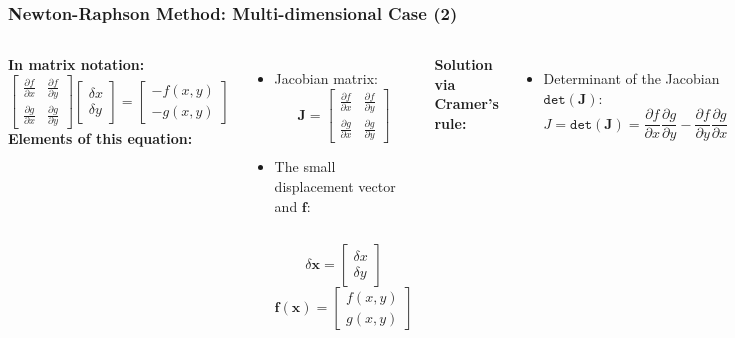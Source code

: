 \begin{frame}[fragile]
  \frametitle{Newton-Raphson Method: Multi-dimensional Case (2)}
  \begin{columns}
  \textbf{In matrix notation:}
  \[
      \begin{bmatrix}
          \frac{\partial f}{\partial x} & \frac{\partial f}{\partial y} \\
          \frac{\partial g}{\partial x} & \frac{\partial g}{\partial y}
      \end{bmatrix}
      \begin{bmatrix}
          \delta x \\
          \delta y
      \end{bmatrix}
      =
      \begin{bmatrix}
          -f(x, y) \\
          -g(x, y)
      \end{bmatrix}
  \]
  \textbf{Elements of this equation:}
  \begin{itemize}
      \item Jacobian matrix:
      \[
          \mathbf{J} = 
          \begin{bmatrix}
              \frac{\partial f}{\partial x} & \frac{\partial f}{\partial y} \\
              \frac{\partial g}{\partial x} & \frac{\partial g}{\partial y}
          \end{bmatrix}
      \]
      \item The small displacement vector and $\mathbf{f}$:
      \begin{columns}
        \[
            \delta \mathbf{x} = 
            \begin{bmatrix}
              \delta x \\
              \delta y
            \end{bmatrix}
        \]
        \[
          \mathbf{f}(\mathbf{x})=
          \begin{bmatrix}
            f(x,y) \\
            g(x,y)
          \end{bmatrix}
          \]
      \end{columns}
  \end{itemize}
  \textbf{Solution via Cramer’s rule:}
  \begin{itemize}
      \item Determinant of the Jacobian $\texttt{det}(\mathbf{J})$:
      \[
          J = \texttt{det}(\mathbf{J}) = \frac{\partial f}{\partial x} \frac{\partial g}{\partial y} - \frac{\partial f}{\partial y} \frac{\partial g}{\partial x}
      \]


\end{itemize}
\end{columns}
\end{frame}
